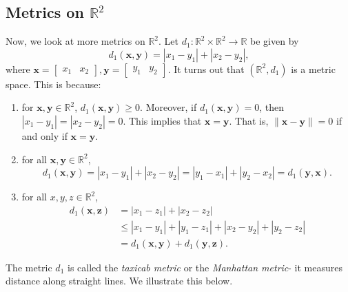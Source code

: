 \documentclass[a4paper, openany]{memoir}
\theoremstyle{definition}
\theoremstyle{plain}
\begin{document}
\subsection{Metrics on $\mathbb{R}^2$}
Now, we look at more metrics on $\mathbb{R}^2$. Let $d_1: \mathbb{R}^2 \times \mathbb{R}^2 \to \mathbb{R}$ be given by
\[d_1(\bm{x}, \bm{y}) = |x_1 - y_1| + |x_2 - y_2|,\]
where $\bm{x} = \begin{bmatrix}
x_1 & x_2
\end{bmatrix}, \bm{y} = \begin{bmatrix}
y_1 & y_2
\end{bmatrix}$. It turns out that $(\mathbb{R}^2, d_1)$ is a metric space. This is because:
\begin{enumerate}[label=\textbf{M\arabic*}.]
    \item for $\bm{x}, \bm{y} \in \mathbb{R}^2$, $d_1(\bm{x}, \bm{y}) \geqslant 0$. Moreover, if $d_1(\bm{x}, \bm{y}) = 0$, then $|x_1 - y_1| = |x_2 - y_2| = 0$. This implies that $\bm{x} = \bm{y}$. That is, $\lVert \bm{x} - \bm{y} \rVert = 0$ if and only if $\bm{x} = \bm{y}$.
    
    \item for all $\bm{x}, \bm{y} \in \mathbb{R}^2$,
    \[d_1(\bm{x}, \bm{y}) = |x_1 - y_1| + |x_2 - y_2| = |y_1 - x_1| + |y_2 - x_2| = d_1(\bm{y}, \bm{x}).\]
    
    \item for all $x, y, z \in \mathbb{R}^2$,
    \begin{align*}
        d_1(\bm{x}, \bm{z}) &= |x_1 - z_1| + |x_2 - z_2| \\
        &\leqslant |x_1 - y_1| + |y_1 - z_1| + |x_2 - y_2| + |y_2 - z_2| \\
        &= d_1(\bm{x}, \bm{y}) + d_1(\bm{y}, \bm{z}).
    \end{align*}
\end{enumerate}
The metric $d_1$ is called the \emph{taxicab metric} or the \emph{Manhattan metric}- it measures distance along straight lines. We illustrate this below.
\begin{figure}[H]
    \centering
\end{figure}
\end{document}

